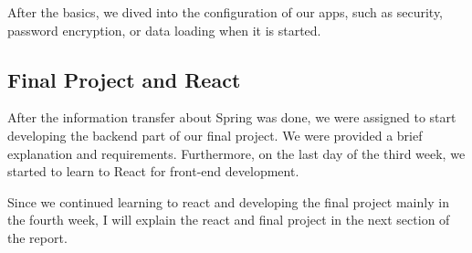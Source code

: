 After the basics, we dived into the configuration of our apps, such as security, password encryption, or data loading when it is started.

\subsection{Final Project and React}

After the information transfer about Spring was done, we were assigned to start developing the backend part of our final project. We were provided a brief explanation and requirements. Furthermore, on the last day of the third week, we started to learn to React for front-end development.

Since we continued learning to react and developing the final project mainly in the fourth week, I will explain the react and final project in the next section of the report.
